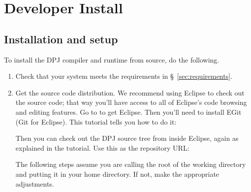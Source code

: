 \section{Developer Install%
\label{sec:dev-install}}

\subsection{Installation and setup}

To install the DPJ compiler and runtime from source, do the following.
%
\begin{enumerate}
%
\item Check that your system meets the requirements in
  \S~\ref{sec:requirements}.
%
\item Get the source code distribution.  We recommend using Eclipse to
  check out the source code; that way you'll have access to all of
  Eclipse's code browsing and editing features.  Go to
   to get Eclipse.  Then you'll need to install
  EGit (Git for Eclipse).  This tutorial tells you how to do it:
%
%
Then you can check out the DPJ source tree from inside Eclipse, again
as explained in the tutorial.  Use this as the repository URL:
%
%
The following steps assume you are calling the root of the working
directory  and putting it in your home directory.  If not,
make the appropriate adjustments.


\end{enumerate}
